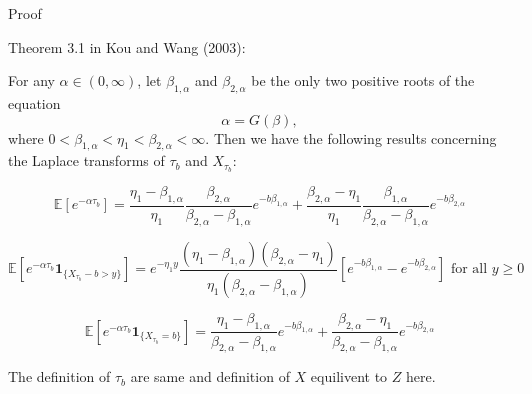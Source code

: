 \documentclass{beamer}
\begin{document}
\begin{frame}{Proof}

    
    {\footnotesize \footnotesize
    \par Theorem 3.1 in Kou and Wang (2003):
    \par For any \(\alpha \in (0, \infty)\), let \(\beta_{1,\alpha}\) and \(\beta_{2,\alpha}\) be the only two positive roots of the equation  
    \[
    \alpha = G(\beta),
    \]  
    where \(0 < \beta_{1,\alpha} < \eta_1 < \beta_{2,\alpha} < \infty\). Then we have the following results concerning the Laplace transforms of \(\tau_b\) and \(X_{\tau_b}\):  

    \[
    \mathbb{E}[e^{-\alpha\tau_b}] = \frac{\eta_1 - \beta_{1,\alpha}}{\eta_1} \frac{\beta_{2,\alpha}}{\beta_{2,\alpha} - \beta_{1,\alpha}} e^{-b\beta_{1,\alpha}} 
    + \frac{\beta_{2,\alpha} - \eta_1}{\eta_1} \frac{\beta_{1,\alpha}}{\beta_{2,\alpha} - \beta_{1,\alpha}} e^{-b\beta_{2,\alpha}}
    \]

    \[
    \mathbb{E}[e^{-\alpha\tau_b} \mathbf{1}_{\{X_{\tau_b} - b > y\}}] = e^{-\eta_1 y} \frac{(\eta_1 - \beta_{1,\alpha})(\beta_{2,\alpha} - \eta_1)}{\eta_1 (\beta_{2,\alpha} 
    - \beta_{1,\alpha})} [e^{-b\beta_{1,\alpha}} - e^{-b\beta_{2,\alpha}}] \text{ for all } y \geq 0
    \]

    \[
    \mathbb{E}[e^{-\alpha\tau_b} \mathbf{1}_{\{X_{\tau_b} = b\}}] = \frac{\eta_1 - \beta_{1,\alpha}}{\beta_{2,\alpha} - \beta_{1,\alpha}} e^{-b\beta_{1,\alpha}} +
     \frac{\beta_{2,\alpha} - \eta_1}{\beta_{2,\alpha} - \beta_{1,\alpha}} e^{-b\beta_{2,\alpha}}
    \]
    \par The definition of $\tau_b$ are same and definition of $X$ equilivent to $Z$ here.




    }
    
\end{frame}
\end{document}
